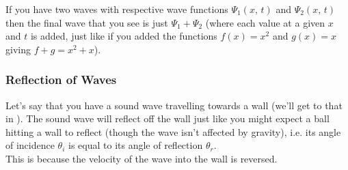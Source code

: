 \documentclass[main.tex]{subfiles}
\begin{document}
                    If you have two waves with respective wave functions $\Psi_1(x,\,t)$ and $\Psi_2(x,\,t)$ then the final wave that you see is just $\Psi_1 + \Psi_2$ (where each value at a given $x$ and $t$ is added, just like if you added the functions $f(x) = x^2$ and $g(x) = x$ giving $f + g = x^2 + x$).


                \subsubsection{Reflection of Waves}
                    \label{subsubsec: Reflection of Waves}

                    Let's say that you have a sound wave travelling towards a wall (we'll get to that in \secref{}). The sound wave will reflect off the wall just like you might expect a ball hitting a wall to reflect (though the wave isn't affected by gravity), i.e. its angle of incidence $\theta_i$ is equal to its angle of reflection $\theta_r$.\\
                    This is because the velocity of the wave into the wall is reversed.
                    
\end{document}
